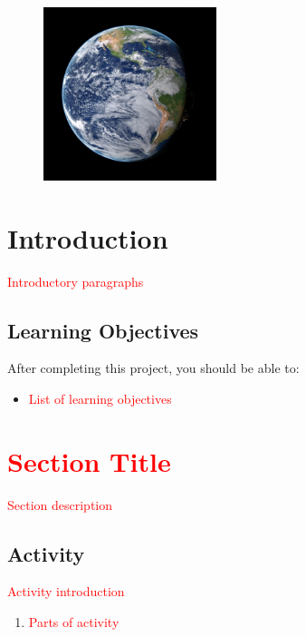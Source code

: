 




\noindent \makebox[\textwidth]{\textbf{\LARGE \textcolor{red}{Title}}}

\quad

\begin{figure}[h]
	\centering
	\includegraphics[width=0.45\textwidth]{figures/earth.jpg}
\end{figure}

\section*{Introduction}

\thispagestyle{fancy} %

\textcolor{red}{Introductory paragraphs}

\subsection*{Learning Objectives}

After completing this project, you should be able to:
\begin{itemize}
	\item \textcolor{red}{List of learning objectives}
\end{itemize}

\section{\textcolor{red}{Section Title}}
\label{sec:sectiontitle}

\textcolor{red}{Section description}

\subsection*{Activity}

\textcolor{red}{Activity introduction}

\begin{enumerate}[\bf {\thesection}a.]
	\item \textcolor{red}{Parts of activity}
\end{enumerate}


